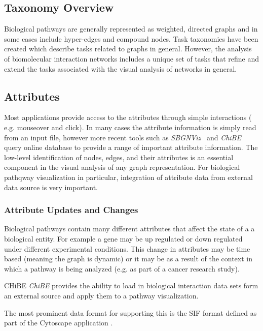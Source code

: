 \documentclass[journal]{vgtc}                %
\begin{document}
\subsection{Taxonomy Overview}

Biological pathways are generally represented as weighted, directed graphs and in some cases include hyper-edges and compound nodes.
Task taxonomies have been created which describe tasks related to graphs in general. However, the analysis of biomolecular interaction networks includes a unique set of tasks that refine and extend the tasks associated with the visual analysis of networks in general.

\subsection{Attributes}


Most applications provide access to the attributes through simple interactions ( e.g. mouseover and click). In many cases the attribute information is simply read from an input file, however more recent tools such as \textit{SBGNViz}~\cite{SBGNViz2015} and \textit{ChiBE}\cite{Babur2010chibe} query online database to provide a range of important attribute information.
The low-level identification of nodes, edges, and their attributes is an essential component in the visual analysis of any graph representation. For biological pathqway visualization in particular, integration of attribute data from external data source is very important.

\subsubsection{Attribute Updates and Changes} %
Biological pathways  contain many different attributes that affect the state of a a biological entity. 
For example a gene may be up regulated or down regulated under different experimental conditions. 
This change in attributes may be time based (meaning the graph is dynamic) or it may be as a result of the context in which a pathway is being analyzed (e.g. as part of a cancer research study).

CHiBE \textit{ChiBE}\cite{Babur2010chibe} provides the ability to load in biological interaction data sets form an external source and apply them to a pathway visualization.

The most prominent data format for supporting this is the SIF format defined as part of the Cytoscape application \cite{Shannon2003cytoscape}. 
\end{document}
